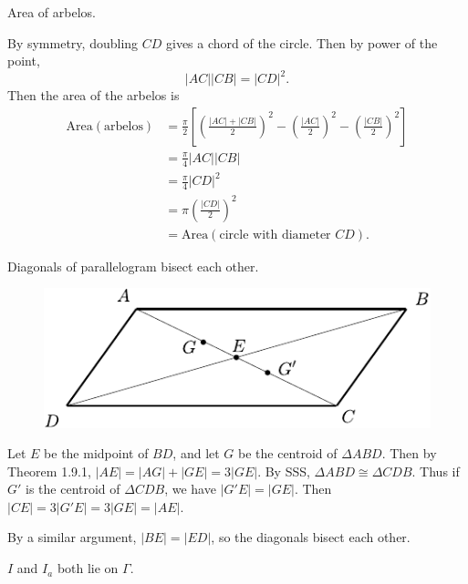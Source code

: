 \documentclass[twoside,10pt]{article}
\begin{document}

\begin{exer}[1.58]
Area of arbelos.
\end{exer}

By symmetry, doubling $CD$ gives a chord of the circle. Then by power of the point,
\[
|AC| |CB| = |CD|^2.
\] Then the area of the arbelos is
\begin{align*}
	\text{Area}(\text{arbelos}) &= \frac{\pi}{2} \left[ \left( \frac{|AC|+|CB|}{2}  \right)^2 - \left(\frac{|AC|}{2}\right)^2 - \left( \frac{|CB|}{2}  \right)^2\right] \\
				    &= \frac{\pi}{4} |AC| |CB| \\
				    &= \frac{\pi}{4} |CD|^2 \\
				    &= \pi \left( \frac{|CD|}{2}  \right)^2 \\
				    &= \text{Area}(\text{circle with diameter } CD).
\end{align*}

\newpage

\begin{exer}[1.71]
Diagonals of parallelogram bisect each other.
\end{exer}

\begin{figure}[H]
	\centering
	\includegraphics[scale=0.8]{fig/71.pdf}
\end{figure}

Let $E$ be the midpoint of $BD$, and let $G$ be the centroid of $\Delta ABD$. Then by Theorem 1.9.1, $|AE| = |AG| + |GE| = 3 |GE|$. By SSS, $\Delta ABD \cong \Delta CDB$. Thus if $G'$ is the centroid of $\Delta CDB$, we have $|G'E| = |GE|$. Then $|CE| = 3 |G'E| = 3 |GE| = |AE|$.

By a similar argument, $|BE|=|ED|$, so the diagonals bisect each other.

\newpage

\begin{exer}[1.79]
$I$ and $I_{a}$ both lie on $\Gamma$.
\end{exer}
\end{document}
